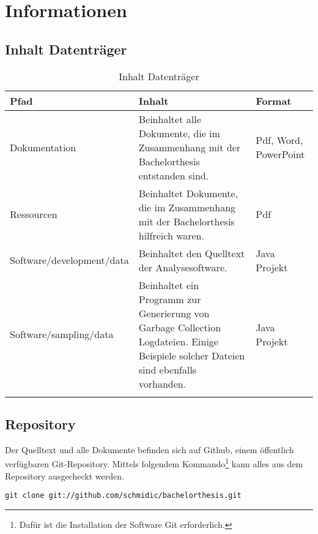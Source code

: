 \chapter{Informationen}

\section{Inhalt Datenträger}
  \begin{longtable}{|p{5.5cm}|p{5cm}|p{2.5cm}|}
\hline
  \textbf{Pfad} & \textbf{Inhalt} & \textbf{Format}\\\hline
    Dokumentation &Beinhaltet alle Dokumente, die im Zusammenhang mit der Bachelorthesis entstanden sind.
&Pdf, Word, PowerPoint\\\hline
    Ressourcen & Beinhaltet Dokumente, die im Zusammenhang mit der Bachelorthesis hilfreich waren. & Pdf\\\hline
    Software/development/data & Beinhaltet den Quelltext der Analysesoftware. & Java Projekt\\\hline
    Software/sampling/data & Beinhaltet ein Programm zur Generierung von Garbage Collection Logdateien. Einige Beispiele solcher Dateien sind ebenfalls vorhanden. & Java Projekt\\\hline
      \caption{Inhalt Datenträger}\\
  \end{longtable}

\section{Repository}
Der Quelltext und alle Dokumente befinden sich auf Github, einem öffentlich verfügbaren Git-Repository. Mittels folgendem Kommando\footnote{Dafür ist die Installation der Software Git erforderlich.} kann alles aus dem Repository ausgecheckt werden.

\begin{lstlisting}[caption=Checkout Quelltext Repository]
git clone git://github.com/schmidic/bachelorthesis.git
\end{lstlisting}



